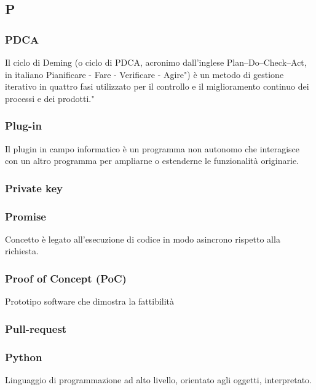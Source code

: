 \subsection*{\textbf{\hfill \Huge{P} \hfill}} 
\subsubsection*{PDCA}
Il ciclo di Deming (o ciclo di PDCA, acronimo dall'inglese Plan–Do–Check–Act, in italiano Pianificare - Fare - Verificare - Agire") è un metodo di gestione iterativo in quattro fasi utilizzato per il controllo e il miglioramento continuo dei processi e dei prodotti."
\subsubsection*{Plug-in}
Il plugin in campo informatico è un programma non autonomo che interagisce con un altro programma per ampliarne o estenderne le funzionalità originarie.
\subsubsection*{Private key}

\subsubsection*{Promise}
Concetto è legato all’esecuzione di codice in modo asincrono rispetto alla richiesta.
\subsubsection*{Proof of Concept (PoC)}
Prototipo software che dimostra la fattibilità 
\subsubsection*{Pull-request}

\subsubsection*{Python}
Linguaggio di programmazione ad alto livello, orientato agli oggetti, interpretato.
